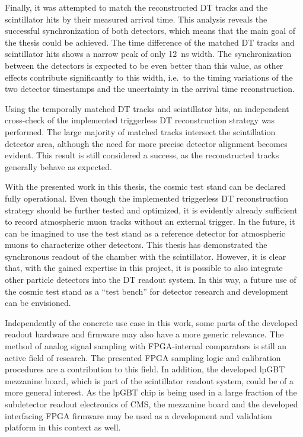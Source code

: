 \par Finally, it was attempted to match the reconstructed \ac{DT} tracks and the scintillator hits by their measured arrival time. This analysis reveals the successful synchronization of both detectors, which means that the main goal of the thesis could be achieved. The time difference of the matched \ac{DT} tracks and scintillator hits shows a narrow peak of only \SI{12}{\nano\second} width. The synchronization between the detectors is expected to be even better than this value, as other effects contribute significantly to this width, i.e.\ to the timing variations of the two detector timestamps and the uncertainty in the arrival time reconstruction.
\par Using the temporally matched \ac{DT} tracks and scintillator hits, an independent cross-check of the implemented triggerless \ac{DT} reconstruction strategy was performed. The large majority of matched tracks intersect the scintillation detector area, although the need for more precise detector alignment becomes evident. This result is still considered a success, as the reconstructed tracks generally behave as expected.
\par With the presented work in this thesis, the cosmic test stand can be declared fully operational. Even though the implemented triggerless \ac{DT} reconstruction strategy should be further tested and optimized, it is evidently already sufficient to record atmospheric muon tracks without an external trigger. In the future, it can be imagined to use the test stand as a reference detector for atmospheric muons to characterize other detectors. This thesis has demonstrated the synchronous readout of the chamber with the scintillator. However, it is clear that, with the gained expertise in this project, it is possible to also integrate other particle detectors into the \ac{DT} readout system. In this way, a future use of the cosmic test stand as a \enquote{test bench} for detector research and development can be envisioned.
\par Independently of the concrete use case in this work, some parts of the developed readout hardware and firmware may also have a more generic relevance. The method of analog signal sampling with \ac{FPGA}-internal comparators is still an active field of research. The presented \ac{FPGA} sampling logic and calibration procedures are a contribution to this field. In addition, the developed \ac{lpGBT} mezzanine board, which is part of the scintillator readout system, could be of a more general interest. As the \ac{lpGBT} chip is being used in a large fraction of the subdetector readout electronics of \ac{CMS}, the mezzanine board and the developed interfacing \ac{FPGA} firmware may be used as a development and validation platform in this context as well.




